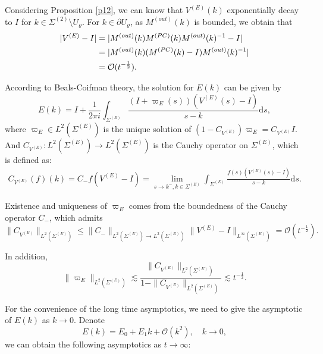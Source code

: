 \documentclass[11pt]{article}
\numberwithin{equation}{section}
\begin{document}
Considering Proposition \ref{p12}, we can know that $V^{(E)}(k)$ exponentially decay to $I$ for $k \in \Sigma^{(2)} \setminus U_{\varrho}$. For $k \in \partial U_{\varrho}$, as $M^{(out)}(k)$ is bounded, we obtain that
\begin{align}
|V^{(E)} - I| &= |M^{(out)}(k) M^{(PC)}(k) M^{(out)}(k)^{-1} - I| \notag \\
&= |M^{(out)}(k)(M^{(PC)}(k) - I)M^{(out)}(k)^{-1}| \notag \\
&= \mathcal{O}(t^{-\frac{1}{2}}).
\end{align}

According to Beals-Coifman theory, the solution for $E(k)$ can be given by
\begin{equation}\label{eq30}
E(k) = I + \frac{1}{2\pi i} \int_{\Sigma^{(E)}} \frac{(I + \varpi_E(s))(V^{(E)}(s) - I)}{s - k} \mathrm{d}s,
\end{equation}
where $\varpi_E \in L^2(\Sigma^{(E)})$ is the unique solution of $(1 - C_{V^{(E)}})\varpi_E = C_{V^{(E)}} I$. And $C_{V^{(E)}}: L^2(\Sigma^{(E)}) \to L^2(\Sigma^{(E)})$ is the Cauchy operator on $\Sigma^{(E)}$, which is defined as:
\begin{align*}
C_{V^{(E)}}(f)(k) = C_{-}f(V^{(E)} - I) = \lim_{s \to k^-, k \in \Sigma^{(E)}} \int_{\Sigma^{(E)}} \frac{f(s)(V^{(E)}(s) - I)}{s - k} \mathrm{d}s.
\end{align*}

Existence and uniqueness of $\varpi_E$ comes from the boundedness of the Cauchy operator $C_{-}$, which admits
\begin{equation*}
\|C_{V^{(E)}}\|_{L^2(\Sigma^{(E)})} \leqslant \|C_{-}\|_{L^2(\Sigma^{(E)}) \to L^2(\Sigma^{(E)})} \|V^{(E)} - I\|_{L^\infty(\Sigma^{(E)})} = \mathcal{O}(t^{-\frac{1}{2}}).
\end{equation*}

In addition,
\begin{equation}\label{eq31}
    \|\varpi_E\|_{L^2(\Sigma^{(E)})} \lesssim \frac{\|C_{V^{(E)}}\|_{L^2(\Sigma^{(E)})}}{1 - \|C_{V^{(E)}}\|_{L^2(\Sigma^{(E)})}} \lesssim t^{-\frac{1}{2}}.
\end{equation}

For the convenience of the long time asymptotics, we need to give the asymptotic of $E(k)$ as $k\to0$. Denote
\begin{equation}
    E(k)=E_0+E_1k+\mathcal{O}(k^2),\quad k\to0,
\end{equation}
we can obtain the following asymptotics as $t\to\infty$:
\end{document}

